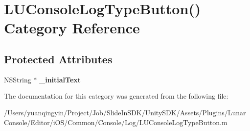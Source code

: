 \hypertarget{category_l_u_console_log_type_button_07_08}{}\section{L\+U\+Console\+Log\+Type\+Button() Category Reference}
\label{category_l_u_console_log_type_button_07_08}
\subsection*{Protected Attributes}
\begin{DoxyCompactItemize}
\item 
\mbox{\label{category_l_u_console_log_type_button_07_08_a2180aa89bc3fb5ae8ede2c10a40709e6}} 
N\+S\+String $\ast$ {\bfseries \+\_\+initial\+Text}
\end{DoxyCompactItemize}


The documentation for this category was generated from the following file\+:\begin{DoxyCompactItemize}
\item 
/\+Users/yuanqingyin/\+Project/\+Job/\+Slide\+In\+S\+D\+K/\+Unity\+S\+D\+K/\+Assets/\+Plugins/\+Lunar\+Console/\+Editor/i\+O\+S/\+Common/\+Console/\+Log/L\+U\+Console\+Log\+Type\+Button.\+m\end{DoxyCompactItemize}
